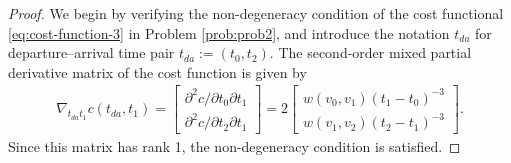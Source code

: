 \documentclass[11pt]{article}
\newcommand{\calT}{{\mathcal T}}
\begin{document}
\begin{proof}
We begin by verifying the non-degeneracy condition of the cost functional \eqref{eq:cost-function-3} in Problem \ref{prob:prob2},
and introduce the notation $t_{da}$ for departure--arrival time pair $t_{da} := (t_0, t_2)$. The second-order mixed partial derivative matrix of the cost function is given by
\begin{align*}
\nabla_{t_{da}t_1} c(t_{da}, t_1) = \begin{bmatrix}
\partial^2 c/\partial t_0 \partial t_1\\[0.08in]
\partial^2 c/\partial t_2 \partial t_1
\end{bmatrix} =
2
\begin{bmatrix}
w(v_0,v_1)(t_1 - t_0)^{-3} \\[0.08in]
w(v_1,v_2)(t_2 - t_1)^{-3}
\end{bmatrix}.
\end{align*}
Since this matrix has rank 1, the non-degeneracy condition is satisfied.


\end{proof}
\end{document}
